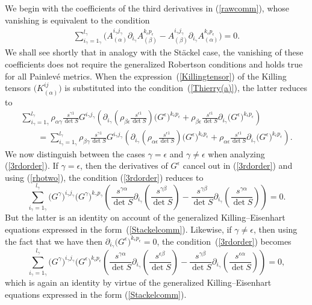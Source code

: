 \documentclass[pdftex]{sigma}
\numberwithin{equation}{section}
\newcommand{\kgamma}{k_{\gamma}}
\newcommand{\pgamma}{p_{\gamma}}
\newcommand{\igamma}{i_{\gamma}}
\newcommand{\jgamma}{j_{\gamma}}
\newcommand{\lgamma}{l_{\gamma}}
\newcommand{\kepsilon}{k_{\epsilon}}
\newcommand{\pepsilon}{p_{\epsilon}}
\begin{document}
We begin with the coefficients of the third derivatives in (\ref{rawcomm}), whose vanishing is equivalent to the condition
\begin{gather}\label{Thierry(a)}
\sum_{\igamma = 1_{\gamma}}^{\lgamma}\big(A_{(\alpha)}^{\igamma \jgamma}\partial_{\igamma}A_{(\beta)}^{\kepsilon \pepsilon}-A_{(\beta)}^{\igamma \jgamma}\partial_{\igamma}A_{(\alpha)}^{\kepsilon \pepsilon}\big)=0.
\end{gather}
We shall see shortly that in analogy with the St\"ackel case, the vanishing of these coefficients does not require the generalized Robertson conditions and holds true for all Painlev\'e metrics. When the expression~(\ref{Killingtensor}) of the Killing tensors $\big(K_{(\alpha)}^{ij}\big)$ is substituted into the condition~(\ref{Thierry(a)}), the latter reduces to
\begin{gather}
\sum_{\igamma = 1_{\gamma}}^{\lgamma}\rho_{\alpha \gamma}\frac{s^{\gamma 1}}{\det S}G^{\igamma \jgamma}\left(\partial_{\igamma}\left(\rho_{\beta \epsilon}\frac{s^{\epsilon 1}}{\det S}\right)\big(G^{\epsilon}\big)^{\kepsilon \pepsilon}+\rho_{\beta \epsilon}\frac{s^{\epsilon 1}}{\det S}\partial_{\igamma}\big(G^{\epsilon}\big)^{\kepsilon \pepsilon}\right)\nonumber\\
\qquad {} = \sum_{\igamma = 1_{\gamma}}^{\lgamma}\rho_{\beta \gamma}\frac{s^{\gamma 1}}{\det S}G^{\igamma \jgamma}\left(\partial_{\igamma}\left(\rho_{\alpha \epsilon}\frac{s^{\epsilon 1}}{\det S}\right)\big(G^{\epsilon}\big)^{\kepsilon \pepsilon}+\rho_{\alpha \epsilon}\frac{s^{\epsilon 1}}{\det S}\partial_{\igamma}\big(G^{\epsilon}\big)^{\kepsilon \pepsilon}\right).\label{3rdorder}
\end{gather}
We now distinguish between the cases $\gamma=\epsilon$ and $\gamma\neq \epsilon$ when analyzing (\ref{3rdorder}). If $\gamma=\epsilon$, then the derivatives of $G^{\epsilon}$ cancel out in (\ref{3rdorder}) and using (\ref{rhotwo}), the condition (\ref{3rdorder}) reduces to
\[
\sum_{\igamma = 1_{\gamma}}^{\lgamma} \big(G^{\gamma}\big)^{\igamma \jgamma}\big(G^{\gamma}\big)^{\kgamma \pgamma}\left( \frac{s^{\gamma \alpha}}{\det S}\partial_{\igamma}\left(\frac{s^{\gamma \beta}}{\det S}\right)-\frac{s^{\gamma \beta}}{\det S}\partial_{\igamma}\left(\frac{s^{\gamma \alpha}}{\det S}\right)\right)=0.
\]
But the latter is an identity on account of the generalized Killing--Eisenhart equations expressed in the form~(\ref{Stackelcomm}). Likewise, if $\gamma \neq \epsilon$, then using the fact that we have then $\partial_{\igamma}\big(G^{\epsilon}\big)^{\kepsilon \pepsilon}=0$, the condition~(\ref{3rdorder}) becomes
\[
\sum_{\igamma = 1_{\gamma}}^{\lgamma}\big(G^{\gamma}\big)^{\igamma \jgamma}\big(G^{\epsilon}\big)^{\kepsilon \pepsilon}\left( \frac{s^{\gamma \alpha}}{\det S}\partial_{\igamma}\left(\frac{s^{\epsilon \beta}}{\det S}\right)-\frac{s^{\gamma \beta}}{\det S}\partial_{\igamma}\left(\frac{s^{\epsilon \alpha}}{\det S}\right)\right)=0,
\]
which is again an identity by virtue of the generalized Killing--Eisenhart equations expressed in the form (\ref{Stackelcomm}).
\end{document}
